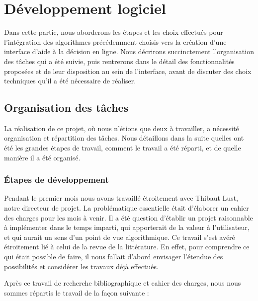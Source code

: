 \documentclass[a4paper, 10pt]{article}
\begin{document}
\newpage
\section{Développement logiciel}
\label{sec:developpement}

Dans cette partie, nous aborderons les étapes et les choix effectués pour l'intégration des algorithmes précédemment choisis vers la création d'une interface d'aide à la décision en ligne. Nous décrirons succinctement l'organisation des tâches qui a été suivie, puis rentrerons dans le détail des fonctionnalités proposées et de leur disposition au sein de l'interface, avant de discuter des choix techniques qu'il a été nécessaire de réaliser.

\subsection{Organisation des tâches}
\label{sec:developpement_orga}

La réalisation de ce projet, où nous n'étions que deux à travailler, a nécessité organisation et répartition des tâches. Nous détaillons dans la suite quelles ont été les grandes étapes de travail, comment le travail a été réparti, et de quelle manière il a été organisé.

\subsubsection{Étapes de développement}
\label{sec:developpement_orga_etapes}

Pendant le premier mois nous avons travaillé étroitement avec Thibaut Lust, notre directeur de projet. La problématique essentielle était d’élaborer un cahier des charges pour les mois à venir. Il a été question d’établir un projet raisonnable à implémenter dans le temps imparti, qui apporterait de la valeur à l’utilisateur, et qui aurait un sens d’un point de vue algorithmique. Ce travail s’est avéré étroitement lié à celui de la revue de la littérature. En effet, pour comprendre ce qui était possible de faire, il nous fallait d’abord envisager l’étendue des possibilités et considérer les travaux déjà effectués.

Après ce travail de recherche bibliographique et cahier des charges, nous nous sommes répartis le travail de la façon suivante :
\end{document}
